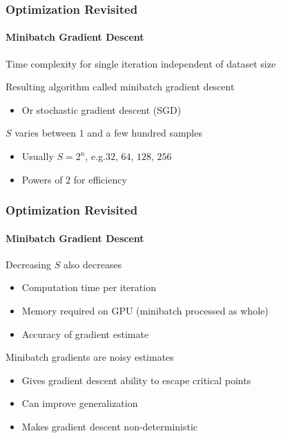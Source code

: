 \documentclass[xetex,professionalfont]{beamer}
\renewcommand\emph[1]{\textcolor{tuwcvl_cvl_blue}{#1}}
\newcommand{\eg}{\mbox{e.g.}\xspace} %
\begin{document}
\begin{frame}
\frametitle{Optimization Revisited}
\framesubtitle{Minibatch Gradient Descent}

Time complexity for single iteration independent of dataset size

\bigskip

Resulting algorithm called \emph{minibatch gradient descent}
\begin{itemize}
    \item Or \emph{stochastic gradient descent} (\emph{SGD})
\end{itemize}

\bigskip

$S$ varies between $1$ and a few hundred samples
\begin{itemize}
    \item Usually $S=2^n$, \eg $32$, $64$, $128$, $256$
    \item Powers of $2$ for efficiency
\end{itemize}

\end{frame}


\begin{frame}
\frametitle{Optimization Revisited}
\framesubtitle{Minibatch Gradient Descent}

Decreasing $S$ also decreases
\begin{itemize}
    \item Computation time per iteration
    \item Memory required on GPU (minibatch processed as whole)
    \item Accuracy of gradient estimate
\end{itemize}

\bigskip

Minibatch gradients are noisy estimates
\begin{itemize}
    \item Gives gradient descent ability to escape critical points
    \item Can improve generalization %
    \item Makes gradient descent non-deterministic %
\end{itemize}

\end{frame}
\end{document}
